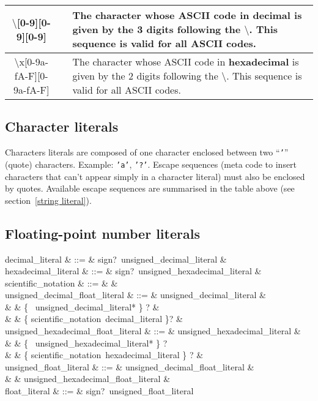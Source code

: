 \begin{tabular}{|c|c|p{7cm}|}
  \hline
  $\setminus$[0-9][0-9][0-9] &  & The character whose ASCII code in
                                  {\bf decimal} is given by the 3 digits
                                  following the $\setminus$. This
                                  sequence is valid for all
                                  ASCII codes. \\
  \hline
  $\setminus$x[0-9a-fA-F][0-9a-fA-F] & & The character whose ASCII code in
                                  {\bf hexadecimal} is given by the 2
                                  digits following the $\setminus$. This
                                  sequence is valid for all
                                  ASCII codes.\\
  \hline
\end{tabular}

\subsection{Character literals}
\label{character literals}
\label{hexadecimal}
Characters literals are composed of one character enclosed between two
``{\tt '}'' (quote) characters. Example: {\tt 'a'}, {\tt '?'}.
Escape sequences (meta code to insert characters that can't appear
simply in a character literal) must also be enclosed by
quotes. Available escape sequences are summarised in the table above
(see section~\ref{string literal}).

\subsection{Floating-point number literals}
\begin{syntax}
                 decimal\_literal & ::= & sign?\ unsigned\_decimal\_literal & \\
             hexadecimal\_literal & ::= & sign?\ unsigned\_hexadecimal\_literal & \\
             scientific\_notation & ::= &  \mid {} & \\
unsigned\_decimal\_float\_literal & ::= & unsigned\_decimal\_literal & \\
                                  & &  \{ \ unsigned\_decimal\_literal* \} ? & \\
                                  & &  \{ scientific\_notation\ decimal\_literal \}? & \\
unsigned\_hexadecimal\_float\_literal & ::= & unsigned\_hexadecimal\_literal &\\
                                  & & \{ \ unsigned\_hexadecimal\_literal* \} ? \\
                                  & & \{ scientific\_notation\ hexadecimal\_literal \} ? & \\
         unsigned\_float\_literal & ::= & unsigned\_decimal\_float\_literal & \\
                                  & & \mid unsigned\_hexadecimal\_float\_literal & \\
                   float\_literal & ::= & sign?\ unsigned\_float\_literal
\end{syntax}

